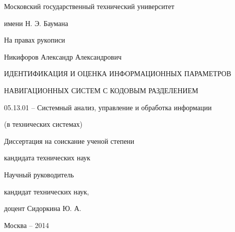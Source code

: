 \noindent\centerline{Московский государственный технический университет}
\noindent\centerline{имени Н. Э. Баумана}
\vspace{\baselineskip}
\vspace{\baselineskip}

\hfill На правах рукописи

\vspace{\baselineskip}
\vspace{\baselineskip}

\noindent\centerline{Никифоров Александр Александрович}

\vspace{\baselineskip}
\vspace{\baselineskip}

\noindent\centerline{ИДЕНТИФИКАЦИЯ И ОЦЕНКА ИНФОРМАЦИОННЫХ ПАРАМЕТРОВ}
\noindent\centerline{НАВИГАЦИОННЫХ СИСТЕМ С КОДОВЫМ РАЗДЕЛЕНИЕМ}

\vspace{\baselineskip}

\noindent\centerline{05.13.01 – Системный анализ, управление и обработка информации}
\noindent\centerline{(в технических системах)}

\vspace{\baselineskip}
\vspace{\baselineskip}

\noindent\centerline{Диссертация на соискание ученой степени}
\noindent\centerline{кандидата технических наук}

\vspace{\baselineskip}
\vspace{\baselineskip}

\hfill{Научный руководитель}

\hfill{кандидат технических наук,}

\hfill{доцент Сидоркина Ю. А.}

\vfill
\noindent\centerline{Москва – 2014}

\newpage
